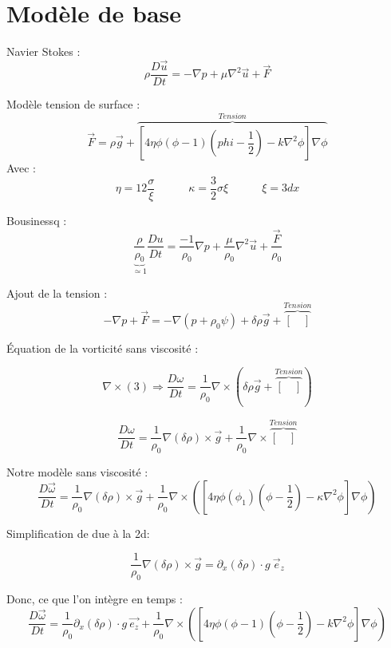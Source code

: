 \documentclass[10pt,a4paper]{article}
\author{Malo Kerebel}
\begin{document}
\section{Modèle de base}


Navier Stokes :
\begin{equation}
	\rho \dfrac{D \vec{u}}{D t} = - \nabla p + \mu \nabla^2 \vec{u} + \vec{F}
\end{equation}

Modèle tension de surface :
\begin{equation}
	\vec{F} = \rho \vec{g} + \overbrace{\left[ 4 \eta \phi (\phi - 1) \left(phi - \dfrac{1}{2} \right) - k\nabla^2 \phi \right] \nabla \phi}^{Tension}
\end{equation}
Avec :
\[
	\eta = 12 \dfrac{\sigma}{\xi} \quad \quad \quad \kappa = \dfrac{3}{2} \sigma \xi \quad \quad \quad \xi = 3 dx
\]

Bousinessq :
\begin{equation}
	\underbrace{\dfrac{\rho}{\rho_0}}_{\simeq 1} \dfrac{D u}{D t} = \dfrac{-1}{\rho_0} \nabla p + \dfrac{\mu }{\rho_0} \nabla^2 \vec{u} + \dfrac{\vec{F}}{\rho_0}
\end{equation}

Ajout de la tension :
\[
	-\nabla p + \vec{F} = - \nabla (p + \rho_0 \psi) + \delta \rho \vec{g} +  \overbrace{[\quad]}^{Tension}
\]

Équation de la vorticité sans viscosité :

\[
	\nabla \times (3) \Rightarrow \dfrac{D\omega}{D t} =  \dfrac{1}{\rho_0} \nabla \times \left( \delta \rho \vec{g} + \overbrace{[\quad]}^{Tension}\right)
\]

\[
	\dfrac{D\omega}{D t} = \dfrac{1}{\rho_0} \nabla (\delta \rho) \times \vec{g} + \dfrac{1}{\rho_0} \nabla \times \overbrace{[\quad]}^{Tension}
\]

Notre modèle sans viscosité :
\[
	\dfrac{D \vec{\omega}}{D t} = \dfrac{1}{\rho_0} \nabla (\delta \rho) \times \vec{g} + \dfrac{1}{\rho_0} \nabla \times \left( \left[ 4 \eta \phi (\phi_1) \left(\phi - \dfrac{1}{2}\right) - \kappa \nabla^2 \phi \right] \nabla \phi \right)
\]

Simplification de  due à la 2d: 

\[  \dfrac{1}{\rho_0} \nabla (\delta \rho) \times \vec{g} = \partial_x (\delta \rho) \cdot g~\vec{e}_z \]


Donc, ce que l'on intègre en temps :
\[
	\dfrac{D \vec{\omega}}{D t} = \dfrac{1}{\rho_0} \partial_x (\delta \rho ) \cdot g ~\vec{e_z} + \dfrac{1}{\rho_0} \nabla \times \left( \left[ 4 \eta \phi (\phi - 1) \left(\phi - \dfrac{1}{2} \right) - k\nabla^2 \phi \right] \nabla \phi\right)
\]
\end{document}
